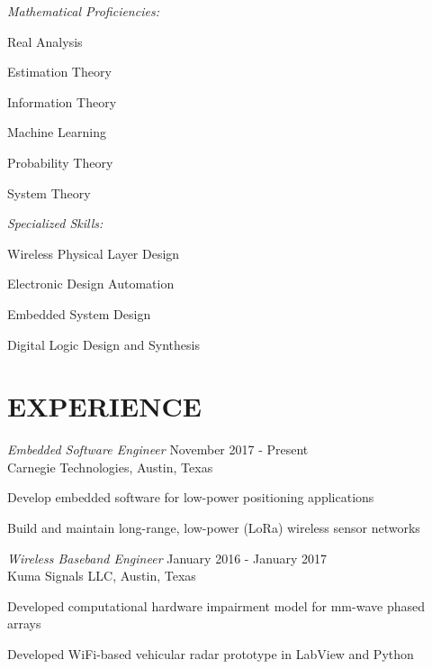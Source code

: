 \documentclass[line,margin=1in]{res}
\begin{document}
\begin{resume}
  \vspace*{-1.5\baselineskip}

  {\sl Mathematical Proficiencies:}
  \vspace*{-0.75\baselineskip}
  \begin{multicols}{3}
    \begin{compactitem}
      \item{Real Analysis}
      \item{Estimation Theory}
      \item{Information Theory}
      \item{Machine Learning}
      \item{Probability Theory}
      \item{System Theory}
    \end{compactitem}
  \end{multicols}

  \vspace*{-1.5\baselineskip}

  {\sl Specialized Skills:}
  \vspace*{-0.75\baselineskip}
  \begin{multicols}{2}
    \begin{compactitem}
      \item{Wireless Physical Layer Design}
      \item{Electronic Design Automation}
      \item{Embedded System Design}
      \item{Digital Logic Design and Synthesis}
    \end{compactitem}
  \end{multicols}

\section{EXPERIENCE} 

{\sl Embedded Software Engineer } \hfill November 2017 - Present \\
Carnegie Technologies, Austin, Texas
\begin{compactitem}
  \item Develop embedded software for low-power positioning applications
  \item Build and maintain long-range, low-power (LoRa) wireless sensor networks
\end{compactitem}

{\sl Wireless Baseband Engineer } \hfill January 2016 - January 2017 \\
Kuma Signals LLC, Austin, Texas
\begin{compactitem}
  \item Developed computational hardware impairment model for mm-wave phased arrays
  \item Developed WiFi-based vehicular radar prototype in LabView and Python
\end{compactitem}


\end{resume}
\end{document}
